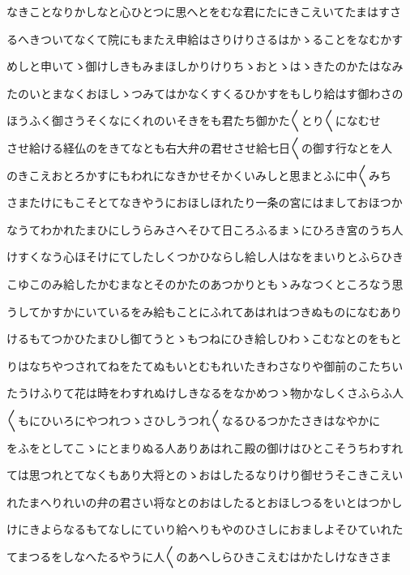 \documentclass[a4paper,11pt,landscape]{ltjtarticle}
\begin{document}
\par\medskip
なきことなりかしなと心ひとつに思へとをむな君にたにきこえいてたまはすさ
\par\medskip
るへきついてなくて院にもまたえ申給はさりけりさるはかゝることをなむかす
\par\medskip
めしと申いてゝ御けしきもみまほしかりけりちゝおとゝはゝきたのかたはなみ
\par\medskip
たのいとまなくおほしゝつみてはかなくすくるひかすをもしり給はす御わさの
\par\medskip
ほうふく御さうそくなにくれのいそきをも君たち御かた〱とり〱になむせ
\par\medskip
させ給ける経仏のをきてなとも右大弁の君せさせ給七日〱の御す行なとを人
\par\medskip
のきこえおとろかすにもわれになきかせそかくいみしと思まとふに中〱みち
\par\medskip
さまたけにもこそとてなきやうにおほしほれたり一条の宮にはましておほつか
\par\medskip
なうてわかれたまひにしうらみさへそひて日ころふるまゝにひろき宮のうち人
\par\medskip
けすくなう心ほそけにてしたしくつかひならし給し人はなをまいりとふらひき
\par\medskip
こゆこのみ給したかむまなとそのかたのあつかりともゝみなつくところなう思
\par\medskip
うしてかすかにいているをみ給もことにふれてあはれはつきぬものになむあり
\par\medskip
けるもてつかひたまひし御てうとゝもつねにひき給しひわゝこむなとのをもと
\par\medskip
りはなちやつされてねをたてぬもいとむもれいたきわさなりや御前のこたちい
\par\medskip
たうけふりて花は時をわすれぬけしきなるをなかめつゝ物かなしくさふらふ人
\par\medskip
〱もにひいろにやつれつゝさひしうつれ〱なるひるつかたさきはなやかに
\par\medskip
をふをとしてこゝにとまりぬる人ありあはれこ殿の御けはひとこそうちわすれ
\par\medskip
ては思つれとてなくもあり大将とのゝおはしたるなりけり御せうそこきこえい
\par\medskip
れたまへりれいの弁の君さい将なとのおはしたるとおほしつるをいとはつかし
\par\medskip
けにきよらなるもてなしにていり給へりもやのひさしにおましよそひていれた
\par\medskip
てまつるをしなへたるやうに人〱のあへしらひきこえむはかたしけなきさま
\par\medskip
\end{document}
